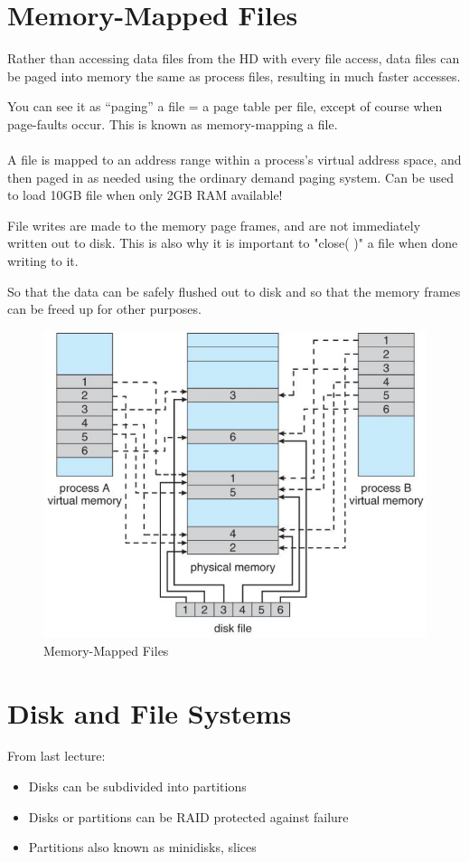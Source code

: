 \section{Memory-Mapped Files}

Rather than accessing data files from the HD with every file access, data
files can be paged into memory the same as process files, resulting in much
faster accesses.

You can see it as “paging” a file = a page table per file, except of course when page-faults occur. This is known as memory-mapping a file.

\paragraph{}
A file is mapped to an address range within a process's virtual address
space, and then paged in as needed using the ordinary demand paging
system. Can be used to load 10GB file when only 2GB RAM available!

File writes are made to the memory page frames, and are not immediately
written out to disk. This is also why it is important to "close( )" a file when done writing to it.

So that the data can be safely flushed out to disk and so that the
memory frames can be freed up for other purposes.


\begin{figure}[h!]
    \centering
    \includegraphics[width=0.5\linewidth]{img/mfh.png}
    \caption{Memory-Mapped Files}
\end{figure}

\newpage
\section{Disk and File Systems}

From last lecture:
\begin{itemize}
    \item Disks can be subdivided into partitions
    \item Disks or partitions can be RAID protected against failure
    \item Partitions also known as minidisks, slices
\end{itemize}

